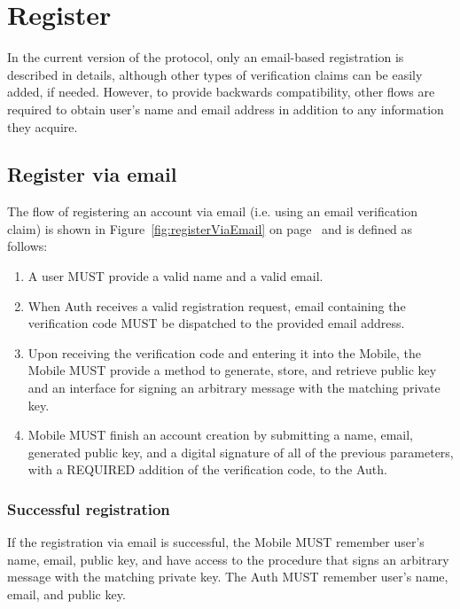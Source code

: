 \section{Register}
In the current version of the protocol, only an email-based registration is described in details, although 	
other types of verification claims can be easily added, if needed. However, to provide backwards compatibility,
other flows are required to obtain user's name and email address in addition to any information they acquire.

      \subsection{Register via email}
      The flow of registering an account via email (i.e. using an email verification claim) is shown in 
      Figure~\ref{fig:registerViaEmail} on page~\pageref{fig:registerViaEmail} and is defined as follows:
      \begin{enumerate}
            \item A user MUST provide a valid name and a valid email.
            \item When Auth receives a valid registration request, email containing the verification code MUST 
                  be dispatched to the provided email address.
            \item Upon receiving the verification code and entering it into the Mobile, the Mobile MUST provide 
                  a method to generate, store, and retrieve public key and an interface for signing an arbitrary 
                  message with the matching private key.
            \item Mobile MUST finish an account creation by submitting a name, email, generated public key, and 
                  a digital signature of all of the previous parameters, with a REQUIRED addition of the 
                  verification code, to the Auth.
      \end{enumerate}  
                 
      
            \subsubsection{Successful registration}
            If the registration via email is successful, the Mobile MUST remember user's name, email, public key, and 
            have access to the procedure that signs an arbitrary message with the matching private key. The Auth MUST 
            remember user's name, email, and public key.

